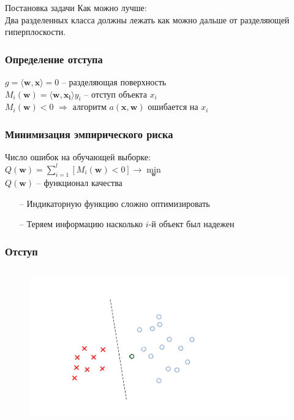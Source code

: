 \documentclass[10pt]{beamer}
\begin{document}
\begin{frame}{Постановка задачи}
  Как можно лучше:\\
  Два разделенных класса должны лежать как можно дальше от разделяющей гиперплоскости.
\end{frame}

\begin{frame}\frametitle{Определение отступа}
	${g = \langle \mathbf{w}, \mathbf{x}\rangle = 0}$ -- разделяющая поверхность\\
	$M_i(\mathbf{w}) = \langle \mathbf{w}, \mathbf{x_i}\rangle y_i$ -- отступ объекта $x_i$\\
	${M_i(\mathbf{w})<0}$ $\Rightarrow$ алгоритм $a(\mathbf{x},\mathbf{w})$ ошибается на $x_i$
\end{frame}

\begin{frame}\frametitle{Минимизация эмпирического риска}
	Число ошибок на обучающей выборке:\\
	\bigbreak
	${Q(\mathbf{w}) = \sum\limits_{i=1}^l \left[ M_i(\mathbf{w}) < 0 \right] \rightarrow \min\limits_{\mathbf{w}} }$\\
	\bigbreak
	${Q(\mathbf{w})}$ -- функционал качества\\
	\bigbreak
  \begin{itemize}
		\item[--] Индикаторную функцию сложно оптимизировать
		\item[--] Теряем информацию насколько ${i}$-й объект был надежен
	\end{itemize}
\end{frame}

\begin{frame}\frametitle{Отступ}
	\begin{figure}[htbp]
	  \includegraphics[height=190pt, keepaspectratio = true]{images/margin1}
	\end{figure}
\end{frame}
\end{document}
